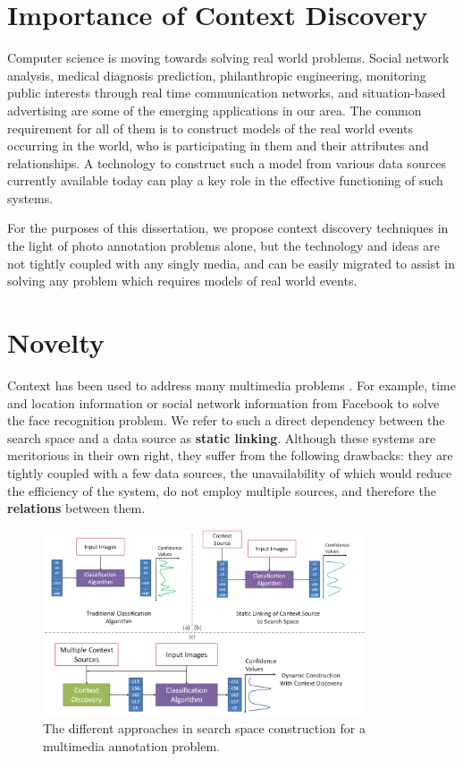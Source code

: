 \section{Importance of Context Discovery}

Computer science is moving towards solving real world problems. Social network analysis, medical diagnosis prediction, philanthropic engineering, monitoring public interests through real time communication networks, and situation-based advertising are some of the emerging applications in our area. The common requirement for all of them is to construct models of the real world events occurring in the world, who is participating in them and their attributes and relationships. A technology to construct such a model from various data sources currently available today can play a key role in the effective functioning of such systems.

For the purposes of this dissertation, we propose context discovery techniques in the light of photo annotation problems alone, but the technology and ideas are not tightly coupled with any singly media, and can be easily migrated to assist in solving any problem which requires models of real world events.

\section{Novelty}

Context has been used to address many multimedia problems \cite{henter2012tag, li2012fusing, naaman2005identity, o2009context,stone2008autotagging}. For example, time and location information or social network information from Facebook to solve the face recognition problem. We refer to such a direct dependency between the search space and a data source as \textbf{static linking}. Although these systems are meritorious in their own right, they suffer from the following drawbacks: they are tightly coupled with a few data sources, the unavailability of which would reduce the efficiency of the system, do not employ multiple sources, and therefore the \textbf{relations} between them.

\begin{figure}[t]
\centering
\includegraphics[width=0.85\textwidth]{media/with-without-cuenet-2.png}
\caption{The different approaches in search space construction for a multimedia annotation problem.}
\label{fig:with-without-cuenet}
\end{figure}

